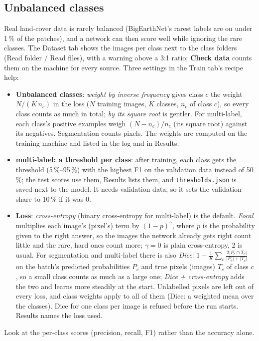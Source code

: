 \documentclass[11pt,a4paper]{article}
\newcommand{\ui}[1]{\textbf{\textsf{#1}}}
\newcommand{\file}[1]{\texttt{#1}}
\begin{document}
\subsection{Unbalanced classes}
\label{sec:imbalance}
Real land-cover data is rarely balanced (BigEarthNet's rarest labels are on under 1\,\% of the patches), and a network can then score
well while ignoring the rare classes. The Dataset tab shows the images per class next to the class folders (Read folder / Read files),
with a warning above a 3:1 ratio; \ui{Check data} counts them on the machine for every source. Three settings in the Train tab's recipe
help:
\begin{itemize}[nosep]
  \item \ui{Unbalanced classes}: \emph{weight by inverse frequency} gives class $c$ the weight $N/(K\,n_c)$ in the loss ($N$ training
        images, $K$ classes, $n_c$ of class $c$), so every class counts as much in total; \emph{by its square root} is gentler. For
        multi-label, each class's positive examples weigh $(N-n_c)/n_c$ (its square root) against its negatives. Segmentation counts
        pixels. The weights are computed on the training machine and listed in the log and in Results.
  \item \ui{multi-label: a threshold per class}: after training, each class gets the threshold (5\,\%--95\,\%) with the highest F1 on the
        validation data instead of 50\,\%; the test scores use them, Results lists them, and \file{thresholds.json} is saved next to the
        model. It needs validation data, so it sets the validation share to 10\,\% if it was 0.
  \item \ui{Loss}: \emph{cross-entropy} (binary cross-entropy for multi-label) is the default. \emph{Focal} multiplies each image's
        (pixel's) term by $(1-p)^\gamma$, where $p$ is the probability given to the right answer, so the images the network already
        gets right count little and the rare, hard ones count more; $\gamma=0$ is plain cross-entropy, 2 is usual. For segmentation and
        multi-label there is also \emph{Dice}: $1-\frac{1}{K}\sum_c \frac{2|P_c\cap T_c|}{|P_c|+|T_c|}$ on the batch's predicted
        probabilities $P_c$ and true pixels (images) $T_c$ of class $c$, so a small class counts as much as a large one; \emph{Dice +
        cross-entropy} adds the two and learns more steadily at the start. Unlabelled pixels are left out of every loss, and class
        weights apply to all of them (Dice: a weighted mean over the classes). Dice for one class per image is refused before the run
        starts. Results names the loss used.
\end{itemize}
Look at the per-class scores (precision, recall, F1) rather than the accuracy alone.
\end{document}
